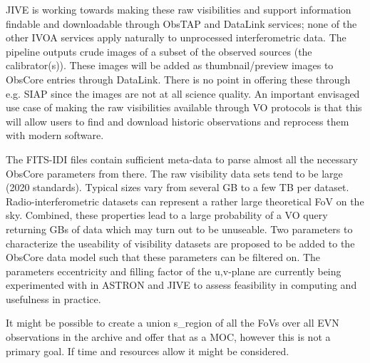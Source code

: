 \documentclass[11pt,a4paper]{ivoa}
\begin{document}
JIVE is working towards making these raw visibilities and support information findable and downloadable through ObsTAP and DataLink services; none of the other IVOA services apply naturally to unprocessed interferometric data. The pipeline outputs crude images of a subset of the observed sources (the calibrator(s)). These images will be added as thumbnail/preview images to ObsCore entries through DataLink. There is no point in offering these through e.g. SIAP since the images are not at all science quality. An important envisaged use case of making the raw visibilities available through VO protocols is that this will allow users to find and download historic observations and reprocess them with modern software.

The FITS-IDI files contain sufficient meta-data to parse almost all the necessary ObsCore parameters from there. The raw visibility data sets tend to be large (2020 standards). Typical sizes vary from several GB to a few TB per dataset. Radio-interferometric datasets can represent a rather large theoretical FoV on the sky. Combined, these properties lead to a large probability of a VO query returning GBs of data which may turn out to be unuseable. Two parameters to characterize the useability of visibility datasets are proposed to be added to the ObsCore data model such that these parameters can be filtered on. The parameters eccentricity and filling factor of the u,v-plane are currently being experimented with in ASTRON and JIVE to assess feasibility in computing and usefulness in practice.

It might be possible to create a union s\_region of all the FoVs over all EVN observations in the archive and offer that as a MOC, however this is not a primary goal. If time and resources allow it might be considered.
\end{document}
